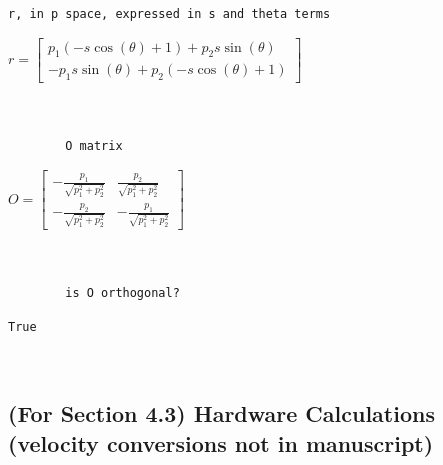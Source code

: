 \documentclass[11pt]{article}
\begin{document}
            \begin{Verbatim}[commandchars=\\\{\}]
        r, in p space, expressed in s and theta terms
            \end{Verbatim}

            $\displaystyle r = \left[\begin{matrix}p_{1} \left(- s \cos{\left(\theta \right)} + 1\right) + p_{2} s \sin{\left(\theta \right)}\\- p_{1} s \sin{\left(\theta \right)} + p_{2} \left(- s \cos{\left(\theta \right)} + 1\right)\end{matrix}\right]$

            
            \begin{Verbatim}[commandchars=\\\{\}]


        O matrix
            \end{Verbatim}

            $\displaystyle O = \left[\begin{matrix}- \frac{p_{1}}{\sqrt{p_{1}^{2} + p_{2}^{2}}} & \frac{p_{2}}{\sqrt{p_{1}^{2} + p_{2}^{2}}}\\- \frac{p_{2}}{\sqrt{p_{1}^{2} + p_{2}^{2}}} & - \frac{p_{1}}{\sqrt{p_{1}^{2} + p_{2}^{2}}}\end{matrix}\right]$

            
            \begin{Verbatim}[commandchars=\\\{\}]


        is O orthogonal?
            \end{Verbatim}

            
            \begin{Verbatim}[commandchars=\\\{\}]
        True
            \end{Verbatim}

            
            \begin{Verbatim}[commandchars=\\\{\}]


            \end{Verbatim}

    \subsection{(For Section 4.3) Hardware Calculations (velocity conversions not in manuscript)}\label{hardware-calculations-for-paper-revisions}
\end{document}
